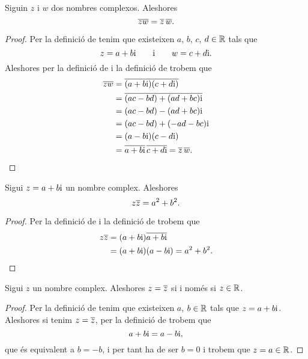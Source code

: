 \documentclass[../../Main.tex]{subfiles}
\begin{document}
	\begin{proposition}
		\label{prop:el conjugat del producte és el producte de conjugats}
		Siguin \(z\) i \(w\) dos nombres complexos.
        Aleshores
		\[
            \overline{zw} = \overline{z}\,\overline{w}.
        \]
		\begin{proof}
			Per la definició de  tenim que existeixen \(a\), \(b\), \(c\), \(d\in\mathbb{R}\) tals que
			\[
                z = a+b\mathrm{i}\qquad\text{i}\qquad w = c+d\mathrm{i}.
            \]
			Aleshores per la definició de  i la definició de  trobem que
			\begin{align*}
				\overline{zw} &= \overline{(a+b\mathrm{i})(c+d\mathrm{i})} \\
				 &= \overline{(ac-bd)+(ad+bc)\mathrm{i}} \\
				 &= (ac-bd)-(ad+bc)\mathrm{i} \\
				 &= (ac-bd)+(-ad-bc)\mathrm{i} \\
				 &= (a-b\mathrm{i})(c-d\mathrm{i}) \\
				 &= \overline{a+b\mathrm{i}}\,\overline{c+d\mathrm{i}} = \overline{z}\,\overline{w}\qedhere.
			\end{align*}
		\end{proof}
	\end{proposition}
	\begin{proposition}
		\label{prop:el producte d'un nombre complex pel seu conjugat és la suma dels quadrats de la seva part real i imaginaria}
		Sigui \(z = a+b\mathrm{i}\) un nombre complex.
        Aleshores
		\[
            z\overline{z} = a^{2}+b^{2}.
        \]
		\begin{proof}
			Per la definició de  i la definició de  trobem que
			\begin{align*}
				z\overline{z} &= (a+b\mathrm{i})\overline{a+b\mathrm{i}} \\
				 &= (a+b\mathrm{i})(a-b\mathrm{i}) = a^{2}+b^{2}.\qedhere
			\end{align*}
		\end{proof}
	\end{proposition}
	\begin{proposition}
		\label{prop:un nombre complex és igual al seu conjugat si i només si és un real}
		Sigui \(z\) un nombre complex.
        Aleshores \(z = \overline{z}\) si i només si \(z\in\mathbb{R}\).
		\begin{proof}
			Per la definició de  tenim que existeixen \(a\), \(b\in\mathbb{R}\) tals que \(z = a+b\mathrm{i}\).
            Aleshores si tenim \(z = \overline{z}\), per la definició de  trobem que
			\[
                a+b\mathrm{i} = a-b\mathrm{i},
            \]
			que és equivalent a \(b = -b\), i per tant ha de ser \(b = 0\) i trobem que \(z = a\in\mathbb{R}\).
		\end{proof}
	\end{proposition}
\end{document}
